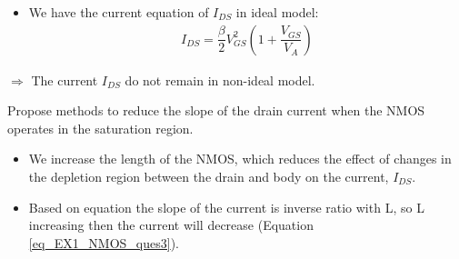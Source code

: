 \begin{question}
\begin{answer}
\begin{itemize}[label=-]
			\item We have the current equation of $I_{DS}$ in ideal model:
			\begin{align}
				I_{DS} = \dfrac{\beta}{2} V_{GS}^{2} \left(1 + \dfrac{V_{GS}}{V_{A}}\right) \label{eq_EX1_NMOS_ques3}
			\end{align}
		\end{itemize}
		
		$\Rightarrow$ The current $I_{DS}$ do not remain in non-ideal model.
	\end{answer}
	
	\item Propose methods to reduce the slope of the drain current when the NMOS operates in the saturation region. 
	
	\begin{answer}
		\begin{itemize}[label=-]
			\item We increase the length of the NMOS, which reduces the effect of changes in the depletion region between the drain and body on the current, $I_{DS}$.
			\item Based on equation the slope of the current is inverse ratio with L, so L increasing then the current will decrease (Equation \ref{eq_EX1_NMOS_ques3}).
		\end{itemize}
	\end{answer}
\end{question}